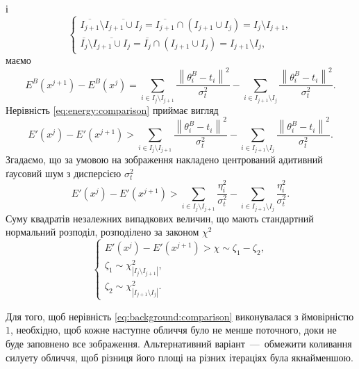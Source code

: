 і
\begin{equation*}
  \begin{cases}
    \overline{I_{j+1}} \setminus \overline{I_{j+1} \cup I_j}
    = \overline{I_{j+1}} \cap \left( I_{j+1} \cup I_j \right)
    = I_{j} \setminus I_{j+1}, \\
    \overline{I_{j}} \setminus \overline{I_{j+1} \cup I_j}
    = \overline{I_{j}} \cap \left( I_{j+1} \cup I_j \right)
    = I_{j+1} \setminus I_{j},
  \end{cases}
\end{equation*}
маємо
\begin{equation*}
  E^B\left( x^{j+1} \right) - E^B\left( x^j \right)
  = \sum_{i \in I_j \setminus I_{j+1}} \frac{\left\| \theta_i^B - t_i \right\|^2}{\sigma^2_t}
    - \sum_{i \in I_{j+1} \setminus I_j} \frac{\left\| \theta_i^B - t_i \right\|^2}{\sigma^2_t}.
\end{equation*}
Нерівність \eqref{eq:energy:comparison} приймає вигляд
\begin{equation*}
  E'\left( x^j \right) - E'\left( x^{j+1} \right)
  > \sum_{i \in I_j \setminus I_{j+1}} \frac{\left\| \theta_i^B - t_i \right\|^2}{\sigma^2_t}
    - \sum_{i \in I_{j+1} \setminus I_j} \frac{\left\| \theta_i^B - t_i \right\|^2}{\sigma^2_t}.
\end{equation*}
Згадаємо, що за умовою на зображення накладено
центрований адитивний ґаусовий шум з дисперсією $\sigma^2_t$
\begin{equation*}
  E'\left( x^j \right) - E'\left( x^{j+1} \right)
  > \sum_{i \in I_j \setminus I_{j+1}} \frac{\eta_i^2}{\sigma^2_t}
    - \sum_{i \in I_{j+1} \setminus I_j} \frac{\eta_i^2}{\sigma^2_t}.
\end{equation*}
Суму квадратів незалежних випадкових величин,
що мають стандартний нормальний розподіл,
розподілено за законом $\chi^2$
\begin{equation}\label{eq:background:comparison}
  \begin{cases}
    E'\left( x^j \right) - E'\left( x^{j+1} \right)
    > \chi \sim \zeta_1 - \zeta_2, \\
    \zeta_1 \sim \chi^2_{\left| I_j \setminus I_{j+1} \right|}, \\
    \zeta_2 \sim \chi^2_{\left| I_{j+1} \setminus I_j \right|}.
  \end{cases}
\end{equation}

Для того, щоб нерівність \eqref{eq:background:comparison}
виконувалася з ймовірністю $1$,
необхідно, щоб кожне наступне обличчя було не менше поточного,
доки не буде заповнено все зображення.
Альтернативний варіант~---~обмежити коливання силуету обличчя,
щоб різниця його площі на різних ітераціях була якнайменшою.


